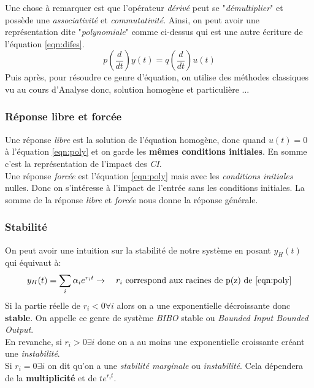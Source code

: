 \documentclass{report}
\begin{document}
Une chose à remarquer est que l'opérateur \textit{dérivé} peut se "\textit{démultiplier}" et possède une \textit{associativité} et \textit{commutativité}. Ainsi, on peut avoir une représentation dite "\textit{polynomiale}" comme ci-dessus qui est une autre écriture de l'équation \ref{eqn:difes}.
\begin{equation}\label{eqn:poly}
p(\frac{d}{dt})y(t) = q (\frac{d}{dt})u(t)
\end{equation}
Puis après, pour résoudre ce genre d'équation, on utilise des méthodes classiques vu au cours d'Analyse donc, solution homogène et particulière ...

\subsubsection{Réponse libre et forcée}
Une réponse \textit{libre} est la solution de l'équation homogène, donc quand $u(t) = 0$ à l'équation \ref{eqn:poly} et on garde les \textbf{mêmes conditions initiales}. En somme c'est la représentation de l'impact des \textit{CI}.\\

Une réponse \textit{forcée} est l'équation \ref{eqn:poly} mais avec les \textit{conditions initiales} nulles. Donc on s'intéresse à l'impact de l'entrée sans les conditions initiales. La somme de la réponse \textit{libre} et \textit{forcée} nous donne la réponse générale.

\subsubsection{Stabilité}
On peut avoir une intuition sur la stabilité de notre système en posant $y_H(t)$ qui équivaut à:
\begin{equation}
y_H(t) = \sum_i \alpha_ie^{r_it} \rightarrow \quad r_i \text{ correspond aux racines de p(z) de \ref{eqn:poly}}
\end{equation}
Si la partie réelle de $r_i < 0 \forall i$ alors on a une exponentielle décroissante donc \textbf{stable}. On appelle ce genre de système \textit{BIBO} stable ou \textit{Bounded Input Bounded Output}.\\

En revanche, si $r_i > 0 \exists i$ donc on a au moins une exponentielle croissante créant une \textit{instabilité}.\\

Si $r_i = 0 \exists i$ on dit qu'on a une \textit{stabilité marginale} ou \textit{instabilité}. Cela dépendera de la \textbf{multiplicité} et de \textbf{$te^{r_it}$}.
\end{document}
